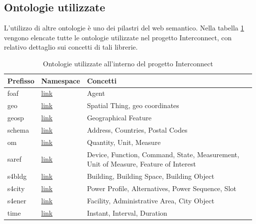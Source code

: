 \subsection{Ontologie utilizzate}
L'utilizzo di altre ontologie è uno dei pilastri del web semantico. Nella tabella \ref{tab:ontologieUtilizzate} vengono elencate tutte le ontologie utilizzate nel progetto Interconnect, con relativo dettaglio sui concetti di tali librerie.
\begin{table}[H]
    \centering
    \begin{tabularx}{\textwidth}{|X|X|X|}
        \hline
        Prefisso & Namespace                                                               & Concetti                                                                            \\
        \hline
        foaf     & \href{http://xmlns.com/foaf/0.1/}{link}                                 & Agent                                                                               \\
        geo      & \href{http://www.w3.org/2003/01/geo/wgs84_pos}{link}                    & Spatial Thing, geo coordinates                                                      \\
        geosp    & \href{http://www.opengis.net/ont/geosparql}{link}                       & Geographical Feature                                                                \\
        schema   & \href{https://schema.org/}{link}                                        & Address, Countries, Postal Codes                                                    \\
        om       & \href{http://www.ontology-of-units-of-measure.org/resource/om-2/}{link} & Quantity, Unit, Measure                                                             \\
        saref    & \href{https://saref.etsi.org/core/}{link}                               & Device, Function, Command, State, Measurement, Unit of Measure, Feature of Interest \\
        s4bldg   & \href{https://saref.etsi.org/saref4bldg/}{link}                         & Building, Building Space, Building Object                                           \\
        s4city   & \href{https://saref.etsi.org/saref4ener/}{link}                         & Power Profile, Alternatives, Power Sequence, Slot                                   \\
        s4ener   & \href{https://saref.etsi.org/saref4city/}{link}                         & Facility, Administrative Area, City Object                                          \\
        time     & \href{http://www.w3.org/2006/time}{link}                                & Instant, Interval, Duration                                                         \\
        \hline
    \end{tabularx}
    \caption{Ontologie utilizzate all'interno del progetto Interconnect}
    \label{tab:ontologieUtilizzate}
\end{table}

